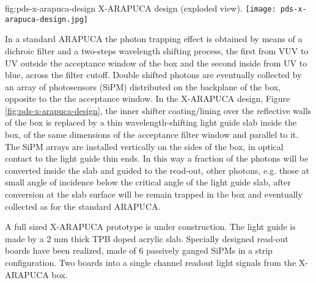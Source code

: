  \begin{dunefigure}{fig:pds-x-arapuca-design}
{X-ARAPUCA design (exploded view).}
   \texttt{[image: pds-x-arapuca-design.jpg]}
\end{dunefigure}


 In a standard ARAPUCA the photon trapping effect is obtained by means of a dichroic filter and a two-steps wavelength shifting process, the first from VUV to UV outside the acceptance window of the box and the second inside from UV to blue, across the filter cutoff. Double shifted photons are eventually collected by an array of photosensors (SiPM) distributed on the backplane of the box, opposite to the the acceptance window. In the X-ARAPUCA design, Figure \ref{fig:pds-x-arapuca-design}, the inner shifter coating/lining over the reflective walls of the box is replaced by a thin wavelength-shifting light guide slab inside the box, of the same dimensions of the acceptance filter window and parallel to it. The SiPM arrays are installed vertically on the sides of the box, in optical contact to the light guide thin ends. 
 In this way a fraction of the photons will be converted inside the slab and guided to the read-out, other photons,  e.g. those at small angle of incidence below the critical angle of the light guide slab, after conversion at the slab surface will be remain trapped in the box and eventually collected as for the standard ARAPUCA.
 
 A full sized X-ARAPUCA prototype is under construction. The light guide is made by a 2 mm thick TPB doped acrylic slab. Specially designed read-out boards have been realized, made of 6 passively ganged SiPMs in a strip configuration.  Two boards into a single channel readout light signals from the X-ARAPUCA box. 
 
